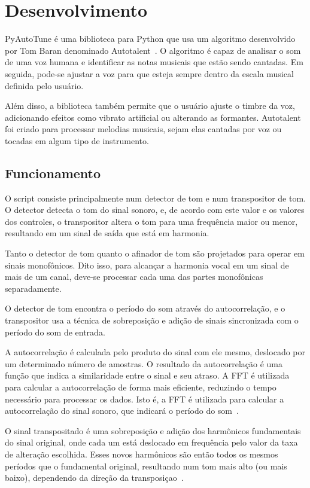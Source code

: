 \documentclass{sbrt}
\begin{document}
\section{Desenvolvimento}

PyAutoTune é uma biblioteca para Python que usa um algoritmo desenvolvido por Tom Baran denominado
Autotalent~\cite{baran2011autotalent}. O algoritmo é capaz de analisar o som de uma voz humana e identificar as notas
musicais que estão sendo cantadas. Em seguida, pode-se ajustar a voz para que esteja sempre dentro da escala musical
definida pelo usuário.

Além disso, a biblioteca também permite que o usuário ajuste o timbre da voz, adicionando efeitos como vibrato
artificial ou alterando as formantes. Autotalent foi criado para processar melodias musicais, sejam elas cantadas por
voz ou tocadas em algum tipo de instrumento.

\subsection{Funcionamento}

O script consiste principalmente num detector de tom e num transpositor de tom. O detector detecta o tom do sinal
sonoro, e, de acordo com este valor e os valores dos controles, o transpositor altera o tom para uma frequência maior ou
menor, resultando em um sinal de saída que está em harmonia.

Tanto o detector de tom quanto o afinador de tom são projetados para operar em sinais monofônicos. Dito isso, para
alcançar a harmonia vocal em um sinal de mais de um canal, deve-se processar cada uma das partes monofônicas
separadamente.

O detector de tom encontra o período do som através do autocorrelação, e o transpositor usa a técnica de sobreposição e
adição de sinais sincronizada com o período do som de entrada.

A autocorrelação é calculada pelo produto do sinal com ele mesmo, deslocado por um determinado número de amostras. O
resultado da autocorrelação é uma função que indica a similaridade entre o sinal e seu atraso. A FFT é utilizada para
calcular a autocorrelação de forma mais eficiente, reduzindo o tempo necessário para processar os dados. Isto é, a FFT é
utilizada para calcular a autocorrelação do sinal sonoro, que indicará o período do som~\cite{myint2010spatial}.

O sinal transpositado é uma sobreposição e adição dos harmônicos fundamentais do sinal original, onde cada um está
deslocado em frequência pelo valor da taxa de alteração escolhida. Esses novos harmônicos são então todos os mesmos
períodos que o fundamental original, resultando num tom mais alto (ou mais baixo), dependendo da direção da
transposiçao~\cite{laprie1998automatic}.
\end{document}
